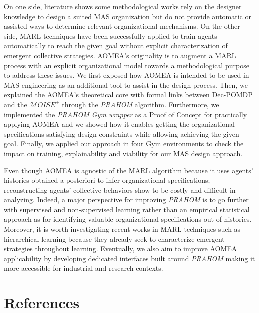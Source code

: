 \documentclass[runningheads]{llncs}
\begin{document}

On one side, literature shows some methodological works rely on the designer knowledge to design a suited MAS organization but do not provide automatic or assisted ways to determine relevant organizational mechanisms.
On the other side, MARL techniques have been successfully applied to train agents automatically to reach the given goal without explicit characterization of emergent collective strategies.
AOMEA's originality is to augment a MARL process with an explicit organizational model towards a methodological purpose to address these issues. We first exposed how AOMEA is intended to be used in MAS engineering as an additional tool to assist in the design process.
Then, we explained the AOMEA's theoretical core with formal links between Dec-POMDP and the $\mathcal{M}OISE^+$ through the \emph{PRAHOM} algorithm.
Furthermore, we implemented the \emph{PRAHOM Gym wrapper} as a Proof of Concept for practically applying AOMEA and we showed how it enables getting the organizational specifications satisfying design constraints while allowing achieving the given goal.
Finally, we applied our approach in four Gym environments to check the impact on training, explainability and viability for our MAS design approach.

Even though AOMEA is agnostic of the MARL algorithm because it uses agents' histories obtained a posteriori to infer organizational specifications; reconstructing agents' collective behaviors show to be costly and difficult in analyzing. Indeed, a major perspective for improving \emph{PRAHOM} is to go further with supervised and non-supervised learning rather than an empirical statistical approach as for identifying valuable organizational specifications out of histories. Moreover, it is worth investigating recent works in MARL techniques such as hierarchical learning because they already seek to characterize emergent strategies throughout learning.
Eventually, we also aim to improve AOMEA applicability by developing dedicated interfaces built around \emph{PRAHOM} making it more accessible for industrial and research contexts.


%
%
% 
% 
%
\section*{References}


% 


\end{document}
